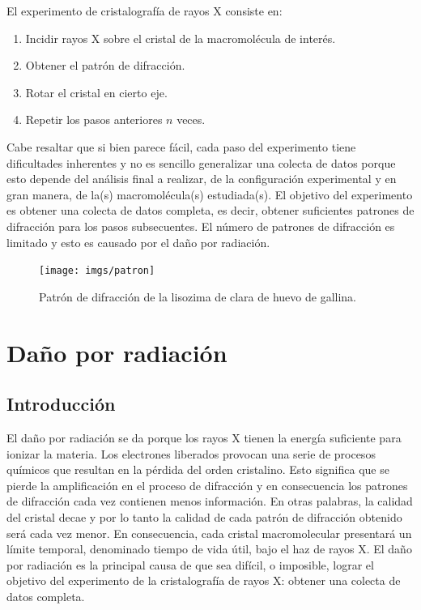 El experimento de cristalografía de rayos X consiste en:

\begin{enumerate}
	\item Incidir rayos X sobre el cristal de la macromolécula de interés. 
	\item Obtener el patrón de difracción. 
	\item Rotar el cristal en cierto eje. 
	\item Repetir los pasos anteriores $n$ veces.
\end{enumerate}

Cabe resaltar que si bien parece fácil, cada paso del experimento tiene dificultades inherentes y no es sencillo generalizar una colecta de datos porque esto depende del análisis final a realizar, de la configuración experimental y en gran manera, de la(s) macromolécula(s) estudiada(s). El objetivo del experimento es obtener una colecta de datos completa, es decir, obtener suficientes patrones de difracción para los pasos subsecuentes. El número de patrones de difracción es limitado y esto es causado por el daño por radiación.

\begin{figure}[hb]
	\texttt{[image: imgs/patron]}
	\caption[Patrón de difracción]{Patrón de difracción de la lisozima de clara de huevo de gallina.}
\end{figure}

\section{Daño por radiación}
\subsection{Introducción}
El daño por radiación se da porque los rayos X tienen la energía suficiente para ionizar la materia. Los electrones liberados provocan una serie de procesos químicos que resultan en la pérdida del orden cristalino. Esto significa que se pierde la amplificación en el proceso de difracción y en consecuencia los patrones de difracción cada vez contienen menos información. En otras palabras, la calidad del cristal decae y por lo tanto la calidad de cada patrón de difracción obtenido será cada vez menor. En consecuencia, cada cristal macromolecular presentará un límite temporal, denominado tiempo de vida útil, bajo el haz de rayos X. El daño por radiación es la principal causa de que sea difícil, o imposible, lograr el objetivo del experimento de la cristalografía de rayos X: obtener una colecta de datos completa.  

